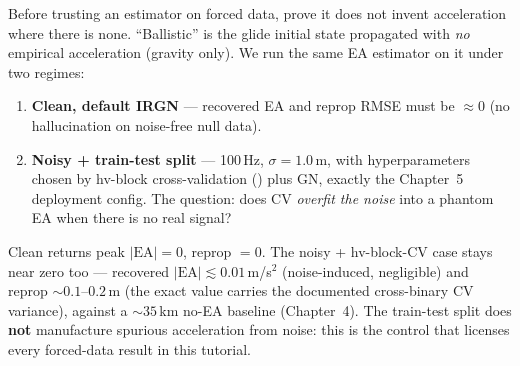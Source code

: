 Before trusting an estimator on forced data, prove it does not invent
acceleration where there is none. ``Ballistic'' is the glide initial state
propagated with \emph{no} empirical acceleration (gravity only). We run the
same EA estimator on it under two regimes:

\begin{enumerate}
\item \textbf{Clean, default IRGN} --- recovered EA and reprop RMSE must be
${\approx}0$ (no hallucination on noise-free null data).
\item \textbf{Noisy + train-test split} --- 100\,Hz, $\sigma=1.0\,$m, with
hyperparameters chosen by hv-block cross-validation () plus
GN, exactly the Chapter~5 deployment config. The question: does CV
\emph{overfit the noise} into a phantom EA when there is no real signal?
\end{enumerate}


Clean returns peak $|\mathrm{EA}|=0$, reprop $=0$. The noisy + hv-block-CV
case stays near zero too --- recovered $|\mathrm{EA}|\lesssim0.01\,$m/s$^2$
(noise-induced, negligible) and reprop ${\sim}0.1$--$0.2\,$m (the exact
value carries the documented cross-binary CV variance), against a
${\sim}35\,$km no-EA baseline (Chapter~4). The train-test split does
\textbf{not} manufacture spurious acceleration from noise: this is the
control that licenses every forced-data result in this tutorial.
